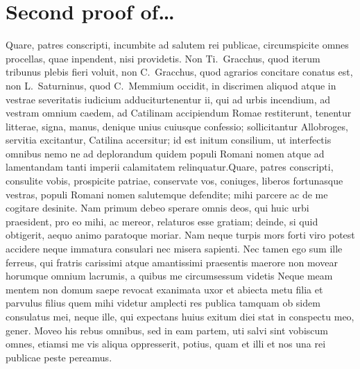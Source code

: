 \documentclass[12pt, a4paper, twoside, english]{report}
\begin{document}
	
	\chapter{Second proof of\dots}
	
	\label{app:proof2}
	
	\thispagestyle{empty}
	
	
	Quare, patres conscripti, incumbite ad salutem rei publicae,
	circumspicite omnes procellas, quae inpendent, nisi providetis. Non
	Ti.~Gracchus, quod iterum tribunus plebis fieri voluit, non
	C.~Gracchus, quod agrarios concitare conatus est, non L.~Saturninus,
	quod C.~Memmium occidit, in discrimen aliquod atque in vestrae
	severitatis iudicium adduciturtenentur ii, qui ad urbis incendium, ad
	vestram omnium caedem, ad Catilinam accipiendum Romae restiterunt,
	tenentur litterae, signa, manus, denique unius cuiusque confessio;
	sollicitantur Allobroges, servitia excitantur, Catilina accersitur; id
	est initum consilium, ut interfectis omnibus nemo ne ad deplorandum
	quidem populi Romani nomen atque ad lamentandam tanti imperii
	calamitatem relinquatur.Quare, patres conscripti, consulite vobis, prospicite patriae,
	conservate vos, coniuges, liberos fortunasque vestras, populi Romani
	nomen salutemque defendite; mihi parcere ac de me cogitare desinite. Nam
	primum debeo sperare omnis deos, qui huic urbi praesident, pro eo mihi,
	ac mereor, relaturos esse gratiam; deinde, si quid obtigerit, aequo
	animo paratoque moriar. Nam neque turpis mors forti viro potest accidere
	neque immatura consulari nec misera sapienti. Nec tamen ego sum ille
	ferreus, qui fratris carissimi atque amantissimi praesentis maerore non
	movear horumque omnium lacrumis, a quibus me circumsessum videtis Neque
	meam mentem non domum saepe revocat exanimata uxor et abiecta metu filia
	et parvulus filius quem mihi videtur amplecti res publica tamquam ob
	sidem consulatus mei, neque ille, qui expectans huius exitum diei stat
	in conspectu meo, gener. Moveo his rebus omnibus, sed in eam partem, uti
	salvi sint vobiscum omnes, etiamsi me vis aliqua oppresserit, potius,
	quam et illi et nos una rei publicae peste pereamus.
	
\end{document}
